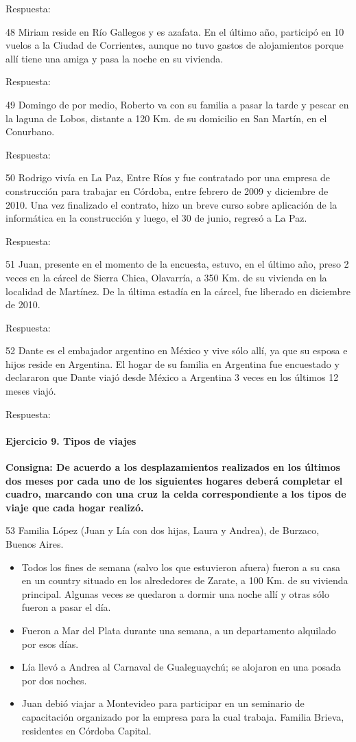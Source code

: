 \documentclass[
  openany]{book}
\begin{document}
Respuesta:

48 Miriam reside en Río Gallegos y es azafata. En el último año, participó en 10 vuelos a la Ciudad de Corrientes, aunque no tuvo gastos de alojamientos porque allí tiene una amiga y pasa la noche en su vivienda.

Respuesta:

49 Domingo de por medio, Roberto va con su familia a pasar la tarde y pescar en la laguna de Lobos, distante a 120 Km. de su domicilio en San Martín, en el Conurbano.

Respuesta:

50 Rodrigo vivía en La Paz, Entre Ríos y fue contratado por una empresa de construcción para trabajar en Córdoba, entre febrero de 2009 y diciembre de 2010. Una vez finalizado el contrato, hizo un breve curso sobre aplicación de la informática en la construcción y luego, el 30 de junio, regresó a La Paz.

Respuesta:

51 Juan, presente en el momento de la encuesta, estuvo, en el último año, preso 2 veces en la cárcel de Sierra Chica, Olavarría, a 350 Km. de su vivienda en la localidad de Martínez. De la última estadía en la cárcel, fue liberado en diciembre de 2010.

Respuesta:

52 Dante es el embajador argentino en México y vive sólo allí, ya que su esposa e hijos reside en Argentina. El hogar de su familia en Argentina fue encuestado y declararon que Dante viajó desde México a Argentina 3 veces en los últimos 12 meses viajó.

Respuesta:

\hypertarget{ejercicio-9.-tipos-de-viajes}{%
\paragraph{Ejercicio 9. Tipos de viajes}\label{ejercicio-9.-tipos-de-viajes}}

\textbf{Consigna: De acuerdo a los desplazamientos realizados en los últimos dos meses por cada uno de los siguientes hogares deberá completar el cuadro, marcando con una cruz la celda correspondiente a los tipos de viaje que cada hogar realizó.}

53 Familia López (Juan y Lía con dos hijas, Laura y Andrea), de Burzaco, Buenos Aires.

\begin{itemize}
\item
  Todos los fines de semana (salvo los que estuvieron afuera) fueron a su casa en un country situado en los alrededores de Zarate, a 100 Km. de su vivienda principal. Algunas veces se quedaron a dormir una noche allí y otras sólo fueron a pasar el día.
\item
  Fueron a Mar del Plata durante una semana, a un departamento alquilado por esos días.
\item
  Lía llevó a Andrea al Carnaval de Gualeguaychú; se alojaron en una posada por dos noches.
\item
  Juan debió viajar a Montevideo para participar en un seminario de capacitación organizado por la empresa para la cual trabaja. Familia Brieva, residentes en Córdoba Capital.
\end{itemize}
\end{document}
